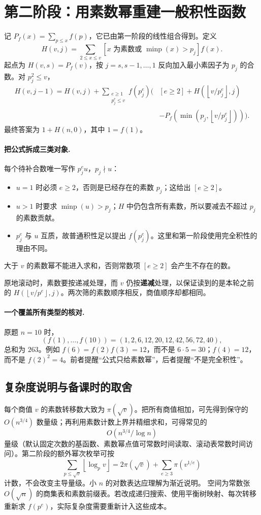 \documentclass[UTF8,a4paper,11pt,twoside,openright,fontset=fandol]{ctexbook}
\theoremstyle{definition}
\newcommand{\floor}[1]{\left\lfloor #1\right\rfloor}
\begin{document}
\section{第二阶段：用素数幂重建一般积性函数}
记 $P_f(x)=\sum_{p\le x}f(p)$，它已由第一阶段的线性组合得到。定义
\[
 H(v,j)=\sum_{2\le x\le v}
 [x\text{ 为素数或 }\operatorname{minp}(x)>p_j]f(x).
\]
起点为 $H(v,s)=P_f(v)$，按 $j=s,s-1,\ldots,1$ 反向加入最小素因子为 $p_j$ 的合数。对 $p_j^2\le v$，
\[
\begin{aligned}
 H(v,j-1)=H(v,j)+\sum_{\substack{e\ge1\\p_j^e\le v}} f(p_j^e)
 \biggl(&[e\ge2]+H(\floor{v/p_j^e},j)\\
 &-P_f(\min(p_j,\floor{v/p_j^e}))\biggr).
\end{aligned}
\]
最终答案为 $1+H(n,0)$，其中 $1=f(1)$。


\paragraph{把公式拆成三类对象.}
每个待补合数唯一写作 $p_j^e u$，$p_j\nmid u$：
\begin{itemize}
\item $u=1$ 时必须 $e\ge2$，否则是已经存在的素数 $p_j$；这给出 $[e\ge2]$。
\item $u>1$ 时要求 $\operatorname{minp}(u)>p_j$；$H$ 中仍包含所有素数，所以要减去不超过 $p_j$ 的素数贡献。
\item $p_j^e$ 与 $u$ 互质，故普通积性足以提出 $f(p_j^e)$。这里和第一阶段使用完全积性的理由不同。
\end{itemize}
大于 $v$ 的素数幂不能进入求和，否则常数项 $[e\ge2]$ 会产生不存在的数。

原地滚动时，素数要按递减处理，而 $v$ 仍按\textbf{递减}处理，以保证读到的是本轮之前的 $H(\floor{v/p^e},j)$。两次筛的素数顺序相反，商值顺序却都相同。

\paragraph{一个覆盖所有类型的核对.}
原题 $n=10$ 时，
\[
(f(1),\ldots,f(10))=(1,2,6,12,20,12,42,56,72,40),
\]
总和为 $263$。例如 $f(6)=f(2)f(3)=12$，而不是 $6\cdot5=30$；$f(4)=12$，而不是 $f(2)^2=4$。前者提醒“公式只给素数幂”，后者提醒“不是完全积性”。

\subsection{复杂度说明与备课时的取舍}
每个商值 $v$ 的素数转移数大致为 $\pi(\sqrt v)$。把所有商值相加，可先得到保守的 $O(n^{3/4})$ 数量级；再利用素数计数上界并精细求和，可得常见的
\[
 O(n^{3/4}/\log n)
\]
量级（默认固定次数的基函数、素数幂点值可常数时间读取、滚动表常数时间访问）。第二阶段的额外幂次枚举可按
\[
 \sum_{p\le\sqrt v}\floor{\log_p v}
 =2\pi(\sqrt v)+\sum_{e\ge3}\pi(v^{1/e})
\]
计数，不会改变主导量级。小 $n$ 的对数表达应理解为渐近说明。
空间为常数张 $O(\sqrt n)$ 的商集表和素数前缀表。若改成递归搜索、使用平衡树映射、每次转移重新求 $f(p^e)$，实际复杂度需要重新计入这些成本。
\end{document}
